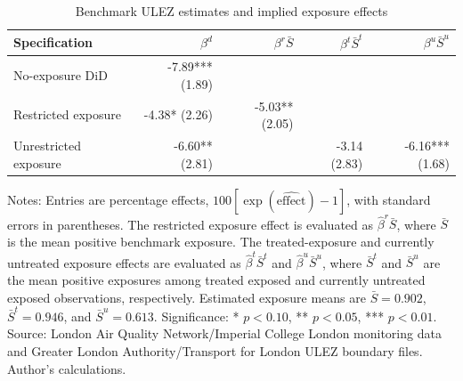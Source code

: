 \begin{table}[!htbp]\centering
\caption{Benchmark ULEZ estimates and implied exposure effects}
\label{tab:ulez_benchmark_implied_effects}
\begin{threeparttable}
\small
\setlength{\tabcolsep}{3pt}
\renewcommand{\arraystretch}{1.08}
\begin{tabularx}{\textwidth}{@{}>{\RaggedRight\arraybackslash}Xrrrr@{}}
\toprule
Specification & $\beta^d$ & $\beta^r\bar S$ & $\beta^t\bar S^t$ & $\beta^u\bar S^u$ \\
\midrule
No-exposure DiD & -7.89*** (1.89) &  &  &  \\
Restricted exposure & -4.38* (2.26) & -5.03** (2.05) &  &  \\
Unrestricted exposure & -6.60** (2.81) &  & -3.14 (2.83) & -6.16*** (1.68) \\
\bottomrule
\end{tabularx}
\begin{tablenotes}[flushleft]
\footnotesize
\item Notes: Entries are percentage effects, $100[\exp(\widehat{\mathrm{effect}})-1]$, with standard errors in parentheses. The restricted exposure effect is evaluated as $\hat\beta^r\bar S$, where $\bar S$ is the mean positive benchmark exposure. The treated-exposure and currently untreated exposure effects are evaluated as $\hat\beta^t\bar S^t$ and $\hat\beta^u\bar S^u$, where $\bar S^t$ and $\bar S^u$ are the mean positive exposures among treated exposed and currently untreated exposed observations, respectively. Estimated exposure means are $\bar S=0.902$, $\bar S^t=0.946$, and $\bar S^u=0.613$. Significance: * $p<0.10$, ** $p<0.05$, *** $p<0.01$. Source: London Air Quality Network/Imperial College London monitoring data and Greater London Authority/Transport for London ULEZ boundary files. Author's calculations.
\end{tablenotes}
\end{threeparttable}
\end{table}
